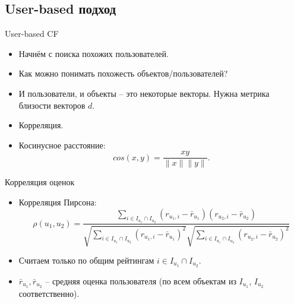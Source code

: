 \documentclass[9pt]{beamer}
\begin{document}

\subsection{User-based подход}

\begin{frame}{User-based CF}

\begin{itemize}
    \item Начнём с поиска похожих пользователей.
     \item Как можно понимать похожесть объектов/пользователей?
     \item И пользователи, и объекты -- это некоторые векторы. Нужна метрика близости векторов $d$.
     \pause
     \item Корреляция.
     \pause
     \item Косинусное расстояние:
     $$cos(x, y) = \frac{xy}{\|x\|\|y\|}.$$
\end{itemize}
\end{frame}

\begin{frame}{Корреляция оценок}
    \begin{itemize}
        \item Корреляция Пирсона:
        $$\rho(u_1, u_2) = \frac{\sum\limits_{i\in I_{u_1}\cap I_{u_2}} (r_{u_1, i} - \bar r_{u_1}) (r_{u_2, i} - \bar r_{u_2})}{\sqrt{\sum\limits_{i\in I_{u_1}\cap I_{u_2}} (r_{u_1, i} - \bar r_{u_1})^2} {\sqrt{\sum\limits_{i\in I_{u_1}\cap I_{u_2}} (r_{u_2, i} - \bar r_{u_2})^2}}  }$$
        \item Считаем только по общим рейтингам $i\in I_{u_1}\cap I_{u_2}$.
        \item $\bar r_{u_1}, \bar r_{u_2}$ – средняя оценка пользователя (по всем объектам из $I_{u_1}$, $I_{u_2}$ соответственно).
    \end{itemize}
\end{frame}
\end{document}
